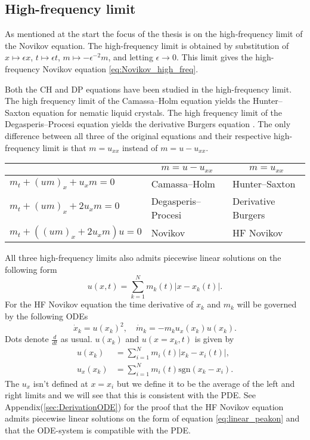 \documentclass[english,master]{liumaiex}
\theoremstyle{plain}
\theoremstyle{definition}
\newcommand{\sgn}{\text{sgn}}
\begin{document}
\subsection{High-frequency limit}

As mentioned at the start the focus of the thesis is on the high-frequency limit of the Novikov equation. The high-frequency limit is obtained by substitution of $x \mapsto \epsilon x$, $t \mapsto \epsilon t$, $m \mapsto -\epsilon^{-2} m$, and letting $\epsilon \rightarrow 0$. This limit gives the high-frequency Novikov equation \eqref{eq:Novikov_high_freq}.

Both the CH and DP equations have been studied in the high-frequency limit.  The high frequency limit of the Camassa--Holm equation yields the Hunter--Saxton equation \cite{HunterSaxton_1991,HunterZheng1994} for nematic liquid crystals. The high frequency limit of the Degasperis--Procesi equation yields the derivative Burgers equation \cite{Kohlenberg_2007, Lundmark_2008}.  The only difference between all three of the original equations and their respective high-frequency limit is that $m = u_{xx}$ instead of $m = u - u_{xx}$.
\begin{center}
  \begin{tabular}{l|c|c}
    & $m=u-u_{xx}$ & $m=u_{xx}$ \\
    \hline
    $m_t + (um)_x + u_xm = 0$ 
	& \multicolumn{1}{l|}{Camassa--Holm} & \multicolumn{1}{l}{Hunter--Saxton} \\
    \hline
    $m_t + (um)_x + 2u_xm = 0$ 
	& \multicolumn{1}{l|}{Degasperis--Procesi} & \multicolumn{1}{l}{Derivative Burgers} \\
    \hline
    $m_t + ((um)_x + 2u_xm)u = 0$ 
	& \multicolumn{1}{l|}{Novikov} & \multicolumn{1}{l}{HF Novikov} \\
  \end{tabular}
\end{center}

All three high-frequency limits also admits piecewise linear solutions on the following form
\begin{equation} \label{eq:linear_peakon}
	u(x, t) = \sum_{k = 1}^{N} m_k(t) |x - x_k(t)|.
\end{equation}
For the HF Novikov equation the time derivative of $x_k$ and $m_k$ will be governed by the following ODEs
\begin{equation} \label{eq:peakon_odes}
\dot{x}_k = u(x_k)^2, \quad
\dot{m}_k = -m_ku_x(x_k)u(x_k).
\end{equation}
Dots denote $\frac{d}{dt}$ as usual. $u(x_k)$ and $u(x = x_k,t)$ is given by
\begin{align}
	u(x_k) &= \sum_{i = 1}^{N} m_i(t) |x_k - x_i(t)|, \\
	u_x(x_k) &= \sum_{i = 1}^{N} m_i(t) \sgn(x_k - x_i).
\end{align}
The $u_x$ isn't defined at $x = x_i$ but we define it to be the average of the left and right limits and we will see that this is consistent with the PDE.  See Appendix(\ref{sec:DerivationODE}) for the proof that the HF Novikov equation admits piecewise linear solutions on the form of equation \eqref{eq:linear_peakon} and that the ODE-system is compatible with the PDE.
\end{document}
